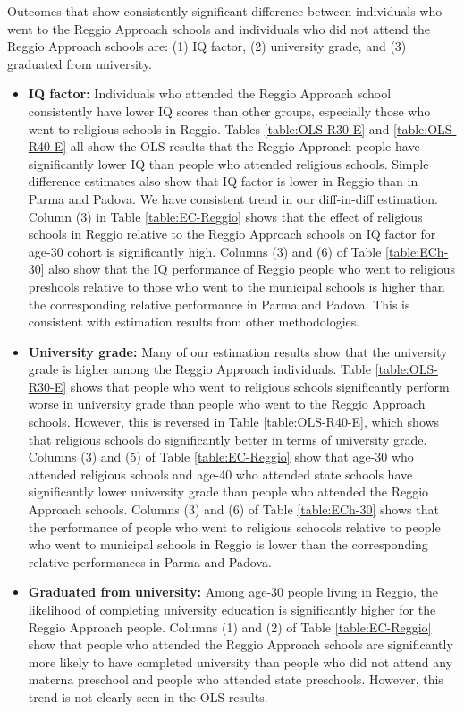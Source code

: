 \documentclass[11pt]{article}
\begin{document}
Outcomes that show consistently significant difference between individuals who went to the Reggio Approach schools and individuals who did not attend the Reggio Approach schools are: (1) IQ factor, (2) university grade, and (3) graduated from university.  
\begin{itemize}
\item \textbf{IQ factor:} Individuals who attended the Reggio Approach school consistently have lower IQ scores than other groups, especially those who went to religious schools in Reggio. Tables \ref{table:OLS-R30-E} and \ref{table:OLS-R40-E} all show the OLS results that the Reggio Approach people have significantly lower IQ than people who attended religious schools. Simple difference estimates also show that IQ factor is lower in Reggio than in Parma and Padova. We have consistent trend in our diff-in-diff estimation. Column (3) in Table \ref{table:EC-Reggio} shows that the effect of religious schools in Reggio relative to the Reggio Approach schools on IQ factor for age-30 cohort is significantly high. Columns (3) and (6) of Table \ref{table:ECh-30} also show that the IQ performance of Reggio people who went to religious preshools relative to those who went to the municipal schools is higher than the corresponding relative performance in Parma and Padova. This is consistent with estimation results from other methodologies.  

\item \textbf{University grade:} Many of our estimation results show that the university grade is higher among the Reggio Approach individuals. Table \ref{table:OLS-R30-E} shows that people who went to religious schools significantly perform worse in university grade than people who went to the Reggio Approach schools. However, this is reversed in Table \ref{table:OLS-R40-E}, which shows that religious schools do significantly better in terms of university grade. Columns (3) and (5) of Table \ref{table:EC-Reggio} show that age-30 who attended religious schools and age-40 who attended state schools have significantly lower university grade than people who attended the Reggio Approach schools. Columns (3) and (6) of Table \ref{table:ECh-30} shows that the performance of people who went to religious schoools relative to people who went to municipal schools in Reggio is lower than the corresponding relative performances in Parma and Padova. 

\item \textbf{Graduated from university:} Among age-30 people living in Reggio, the likelihood of completing university education is significantly higher for the Reggio Approach people. Columns (1) and (2) of Table \ref{table:EC-Reggio} show that people who attended the Reggio Approach schools are significantly more likely to have completed university than people who did not attend any materna preschool and people who attended state preschools. However, this trend is not clearly seen in the OLS results.
\end{itemize}
\end{document}
